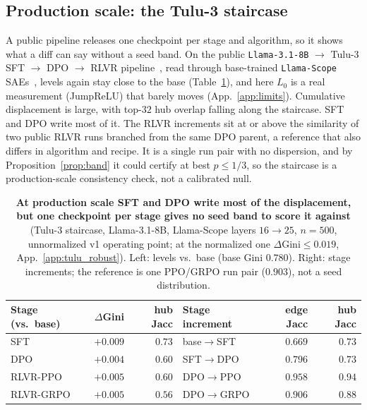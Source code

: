 \documentclass{article}
\begin{document}
\subsection{Production scale: the Tulu-3 staircase}
\label{sec:results-tulu}
A public pipeline releases one checkpoint per stage and algorithm, so it shows what a diff can say without a seed band. On the public \texttt{Llama-3.1-8B} $\to$ Tulu-3 SFT $\to$ DPO $\to$ RLVR pipeline~\citep{lambert2024tulu3,rafailov2023dpo,schulman2017ppo}, read through base-trained \texttt{Llama-Scope} SAEs~\citep{he2024llamascope}, levels again stay close to the base (Table~\ref{tab:tulu}), and here $L_0$ is a real measurement (JumpReLU) that barely moves (App.~\ref{app:limits}). Cumulative displacement is large, with top-$32$ hub overlap falling along the staircase. SFT and DPO write most of it. The RLVR increments sit at or above the similarity of two public RLVR runs branched from the same DPO parent, a reference that also differs in algorithm and recipe. It is a single run pair with no dispersion, and by Proposition~\ref{prop:band} it could certify at best $p\le1/3$, so the staircase is a production-scale consistency check, not a calibrated null.

\begin{table}[t]
\centering
\caption{\textbf{At production scale SFT and DPO write most of the displacement, but one checkpoint per stage gives no seed band to score it against} (Tulu-3 staircase, Llama-3.1-8B, Llama-Scope layers $16{\to}25$, $n{=}500$, unnormalized v1 operating point; at the normalized one $\Delta$Gini${}\le0.019$, App.~\ref{app:tulu_robust}). Left: levels vs.\ base (base Gini $0.780$). Right: stage increments; the reference is one PPO/GRPO run pair ($0.903$), not a seed distribution.}
\label{tab:tulu}
\footnotesize
\begin{tabular}{lrr|lrr}
\toprule
Stage (vs.\ base) & $\Delta$Gini & hub Jacc & Stage increment & edge Jacc & hub Jacc \\
\midrule
SFT       & $+0.009$ & $0.73$ & base$\to$SFT   & $0.669$ & $0.73$ \\
DPO       & $+0.004$ & $0.60$ & SFT$\to$DPO    & $0.796$ & $0.73$ \\
RLVR-PPO  & $+0.005$ & $0.60$ & DPO$\to$PPO    & $0.958$ & $0.94$ \\
RLVR-GRPO & $+0.005$ & $0.56$ & DPO$\to$GRPO   & $0.906$ & $0.88$ \\
\bottomrule
\end{tabular}
\end{table}
\end{document}
